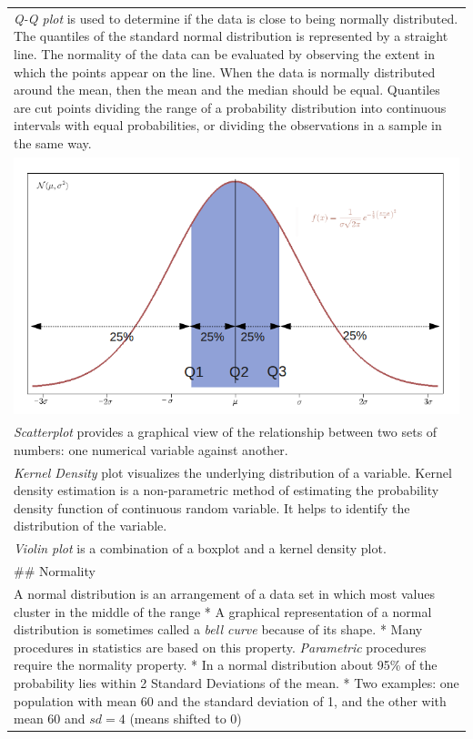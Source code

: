 \documentclass[
]{book}
\begin{document}
\begin{longtable}[]{@{}
  >{\raggedleft\arraybackslash}p{}@{}}
* \emph{Q-Q plot} is used to determine if the data is close to being normally distributed. The quantiles of the standard normal distribution is represented by a straight line. The normality of the data can be evaluated by observing the extent in which the points appear on the line. When the data is normally distributed around the mean, then the mean and the median should be equal. Quantiles are cut points dividing the range of a probability distribution into continuous intervals with equal probabilities, or dividing the observations in a sample in the same way. \\
\includegraphics{./figures/Iqr_with_quantile.png} \\
* \emph{Scatterplot} provides a graphical view of the relationship between two sets of numbers: one numerical variable against another. \\
* \emph{Kernel Density} plot visualizes the underlying distribution of a variable. Kernel density estimation is a non-parametric method of estimating the probability density function of continuous random variable. It helps to identify the distribution of the variable. \\
* \emph{Violin plot} is a combination of a boxplot and a kernel density plot. \\
\#\# Normality \\
* A normal distribution is an arrangement of a data set in which most values cluster in the middle of the range
* A graphical representation of a normal distribution is sometimes called a \emph{bell curve} because of its shape.
* Many procedures in statistics are based on this property. \emph{Parametric} procedures require the normality property.
* In a normal distribution about 95\% of the probability lies within 2 Standard Deviations of the mean.
* Two examples: one population with mean 60 and the standard deviation of 1, and the other with mean 60 and \(sd=4\) (means shifted to 0) \\

\end{longtable}
\end{document}
